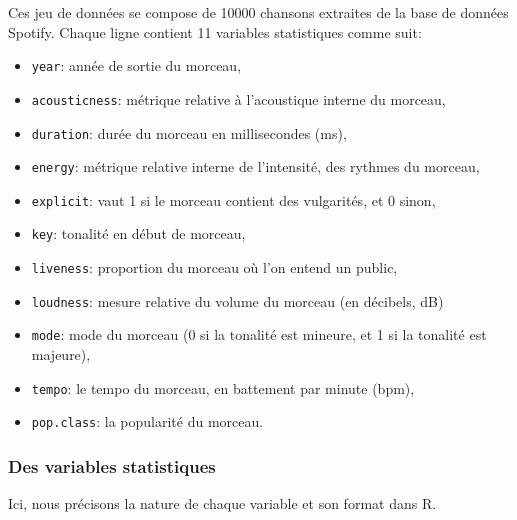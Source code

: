 \documentclass[
  11pt,
  xcolor = usenames,dvipsnames]{article}
\newcommand{\passthrough}[1]{#1}
\providecommand{\tightlist}{%
  \setlength{\itemsep}{0pt}\setlength{\parskip}{0pt}}
\begin{document}
Ces jeu de données se compose de 10000 chansons extraites de la base de données Spotify.
Chaque ligne contient 11 variables statistiques comme suit:

\begin{itemize}
\tightlist
\item
  \passthrough{\lstinline!year!}: année de sortie du morceau,
\item
  \passthrough{\lstinline!acousticness!}: métrique relative à l'acoustique interne du morceau,
\item
  \passthrough{\lstinline!duration!}: durée du morceau en millisecondes (ms),
\item
  \passthrough{\lstinline!energy!}: métrique relative interne de l'intensité, des rythmes du morceau,
\item
  \passthrough{\lstinline!explicit!}: vaut 1 si le morceau contient des vulgarités, et 0 sinon,
\item
  \passthrough{\lstinline!key!}: tonalité en début de morceau,
\item
  \passthrough{\lstinline!liveness!}: proportion du morceau où l'on entend un public,
\item
  \passthrough{\lstinline!loudness!}: mesure relative du volume du morceau (en décibels, dB)
\item
  \passthrough{\lstinline!mode!}: mode du morceau (0 si la tonalité est mineure, et 1 si la tonalité est majeure),
\item
  \passthrough{\lstinline!tempo!}: le tempo du morceau, en battement par minute (bpm),
\item
  \passthrough{\lstinline!pop.class!}: la popularité du morceau.
\end{itemize}

\hypertarget{des-variables-statistiques}{%
\subsubsection{Des variables statistiques}\label{des-variables-statistiques}}

Ici, nous précisons la nature de chaque variable et son format dans R.
\end{document}
